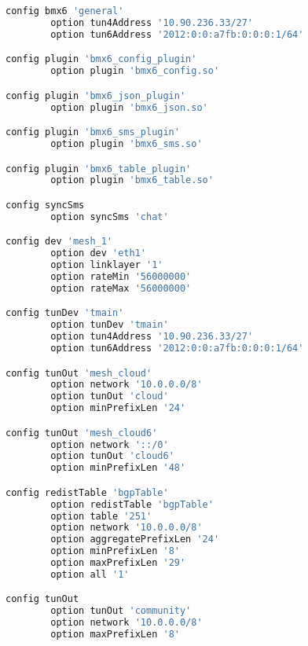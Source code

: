 \begin{lstlisting}[language=bash, caption={BMX6}]
config bmx6 'general'
        option tun4Address '10.90.236.33/27'
        option tun6Address '2012:0:0:a7fb:0:0:0:1/64'

config plugin 'bmx6_config_plugin'
        option plugin 'bmx6_config.so'

config plugin 'bmx6_json_plugin'
        option plugin 'bmx6_json.so'

config plugin 'bmx6_sms_plugin'
        option plugin 'bmx6_sms.so'

config plugin 'bmx6_table_plugin'
        option plugin 'bmx6_table.so'

config syncSms
        option syncSms 'chat'

config dev 'mesh_1'
        option dev 'eth1'
        option linklayer '1'
        option rateMin '56000000'
        option rateMax '56000000'

config tunDev 'tmain'
        option tunDev 'tmain'
        option tun4Address '10.90.236.33/27'
        option tun6Address '2012:0:0:a7fb:0:0:0:1/64'

config tunOut 'mesh_cloud'
        option network '10.0.0.0/8'
        option tunOut 'cloud'
        option minPrefixLen '24'

config tunOut 'mesh_cloud6'
        option network '::/0'
        option tunOut 'cloud6'
        option minPrefixLen '48'

config redistTable 'bgpTable'
        option redistTable 'bgpTable'
        option table '251'
        option network '10.0.0.0/8'
        option aggregatePrefixLen '24'
        option minPrefixLen '8'
        option maxPrefixLen '29'
        option all '1'

config tunOut
        option tunOut 'community'
        option network '10.0.0.0/8'
        option maxPrefixLen '8'
\end{lstlisting}